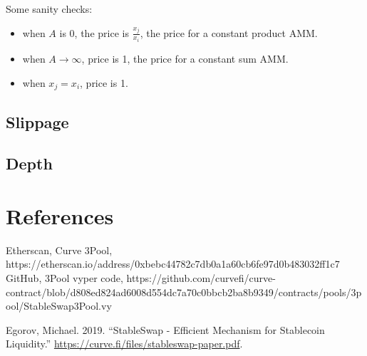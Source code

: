 \documentclass[
]{article}
\providecommand{\tightlist}{%
  \setlength{\itemsep}{0pt}\setlength{\parskip}{0pt}}
\newlength{\cslhangindent}
\newlength{\cslentryspacingunit} %
\newenvironment{CSLReferences}[2] %
 {%
  \setlength{\parindent}{0pt}
  \ifodd #1
  \let\oldpar\par
  \def\par{\hangindent=\cslhangindent\oldpar}
  \fi
  \setlength{\parskip}{#2\cslentryspacingunit}
 }%
 {}
\begin{document}
Some sanity checks:

\begin{itemize}
\tightlist
\item
  when \(A\) is 0, the price is \(\frac{x_j}{x_i}\), the price for a
  constant product AMM.
\item
  when \(A \rightarrow \infty\), price is 1, the price for a constant
  sum AMM.
\item
  when \(x_j = x_i\), price is 1.
\end{itemize}

\hypertarget{slippage}{%
\subsection{Slippage}\label{slippage}}

\hypertarget{depth}{%
\subsection{Depth}\label{depth}}

\hypertarget{references}{%
\section{References}\label{references}}

Etherscan, Curve 3Pool,
https://etherscan.io/address/0xbebc44782c7db0a1a60cb6fe97d0b483032ff1c7
GitHub, 3Pool vyper code,
https://github.com/curvefi/curve-contract/blob/d808ed824ad6008d554dc7a70c0bbcb2ba8b9349/contracts/pools/3pool/StableSwap3Pool.vy

\hypertarget{refs}{}
\begin{CSLReferences}{1}{0}
\leavevmode{}%
Egorov, Michael. 2019. {``StableSwap - Efficient Mechanism for
Stablecoin Liquidity.''}
\url{https://curve.fi/files/stableswap-paper.pdf}.

\end{CSLReferences}
\end{document}
